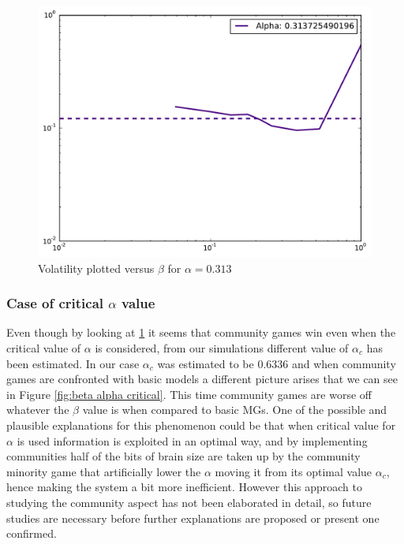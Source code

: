 \begin{figure}[h]
\centering
\includegraphics[scale=0.4]{images/algorithm/patch-0313.pdf}
\caption{Volatility plotted versus $\beta$ for $\alpha=0.313$}
\label{fig:beta alpha 0.3}
\end{figure}

\subsubsection{Case of critical $\alpha$ value}

Even though by looking at \ref{fig:beta alpha 0.3} it seems that community games win even when the critical value of $\alpha$ is considered, from our simulations different value of $\alpha_c$ has been estimated.
In our case $\alpha_c$ was estimated to be $0.6336$ and when community games are confronted with basic models a different picture arises that we can see in Figure \ref{fig:beta alpha critical}.
This time community games are worse off whatever the $\beta$ value is when compared to basic MGs.
One of the possible and plausible explanations for this phenomenon could be that when critical value for $\alpha$ is used information is exploited in an optimal way, and by implementing communities half of the bits of brain size are taken up by the community minority game that artificially lower the $\alpha$ moving it from its optimal value $\alpha_c$, hence making the system a bit more inefficient.
However this approach to studying the community aspect has not been elaborated in detail, so future studies are necessary before further explanations are proposed or present one confirmed.

